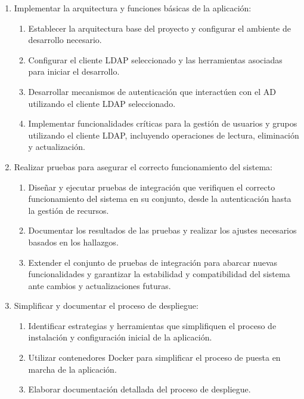 \begin{enumerate}[label=\arabic*., itemindent=*, leftmargin=*]
    \item Implementar la arquitectura y funciones básicas de la aplicación:
          \begin{enumerate}[label=\arabic{enumi}.\arabic*., leftmargin=*]
              \item Establecer la arquitectura base del proyecto y configurar el ambiente de desarrollo necesario.
              \item Configurar el cliente LDAP seleccionado y las herramientas asociadas para iniciar el desarrollo.
              \item Desarrollar mecanismos de autenticación que interactúen con el AD utilizando el cliente LDAP seleccionado.
              \item Implementar funcionalidades críticas para la gestión de usuarios y grupos utilizando el cliente LDAP, incluyendo operaciones de lectura, eliminación y actualización.
          \end{enumerate}

    \item Realizar pruebas para asegurar el correcto funcionamiento del sistema:
          \begin{enumerate}[label=\arabic{enumi}.\arabic*., leftmargin=*]
              \item Diseñar y ejecutar pruebas de integración que verifiquen el correcto funcionamiento del sistema en su conjunto, desde la autenticación hasta la gestión de recursos.
              \item Documentar los resultados de las pruebas y realizar los ajustes necesarios basados en los hallazgos.
              \item Extender el conjunto de pruebas de integración para abarcar nuevas funcionalidades y garantizar la estabilidad y compatibilidad del sistema ante cambios y actualizaciones futuras.
          \end{enumerate}

    \item Simplificar y documentar el proceso de despliegue:
          \begin{enumerate}[label=\arabic{enumi}.\arabic*., leftmargin=*]
              \item Identificar estrategias y herramientas que simplifiquen el proceso de instalación y configuración inicial de la aplicación.
              \item Utilizar contenedores Docker para simplificar el proceso de puesta en marcha de la aplicación.
              \item Elaborar documentación detallada del proceso de despliegue.
          \end{enumerate}


\end{enumerate}
